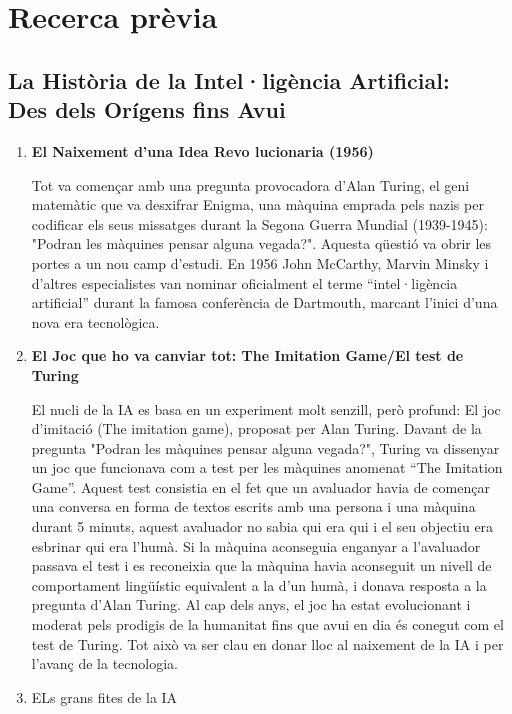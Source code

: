  \chapter{Recerca prèvia}
\label{c:recerca prèvia}
\section{La Història de la Intel·ligència Artificial:\\Des dels Orígens fins Avui}
\begin{enumerate}
     \item \textbf{El Naixement d'una Idea Revo lucionaria (1956)}

             Tot va començar amb una pregunta provocadora d’Alan Turing, el geni matemàtic que va desxifrar Enigma, una màquina emprada pels nazis per codificar els seus missatges durant la Segona Guerra Mundial (1939-1945): "Podran les màquines pensar alguna vegada?". Aquesta qüestió va obrir les portes a un nou camp d’estudi. En 1956 John McCarthy, Marvin Minsky i d'altres especialistes van nominar oficialment el terme ``intel·ligència artificial'' durant la famosa conferència de Dartmouth, marcant l'inici d'una nova era tecnològica.

      \item \textbf{El Joc que ho va canviar tot: The Imitation Game/El test de Turing}

            El nucli de la IA es basa en un experiment molt senzill, però profund: El joc d'imitació (The imitation game), proposat per Alan Turing. Davant de la pregunta "Podran les màquines pensar alguna vegada?", Turing va dissenyar un joc que funcionava com a test per les màquines anomenat ``The Imitation Game''. Aquest test consistia en el fet que un avaluador havia de començar una conversa en forma de textos escrits amb una persona i una màquina durant 5 minuts, aquest avaluador no sabia qui era qui i el seu objectiu era esbrinar qui era l'humà. Si la màquina aconseguia enganyar a l'avaluador passava el test i es reconeixia que la màquina havia aconseguit un nivell de comportament lingüístic equivalent a la d'un humà, i donava resposta a la pregunta d'Alan Turing. Al cap dels anys, el joc ha estat evolucionant i moderat pels prodigis de la humanitat fins que avui en dia és conegut com el test de Turing. Tot això va ser clau en donar lloc al naixement de la IA i per l'avanç de la tecnologia. \\

     \item ELs grans fites de la IA

\end{enumerate}
